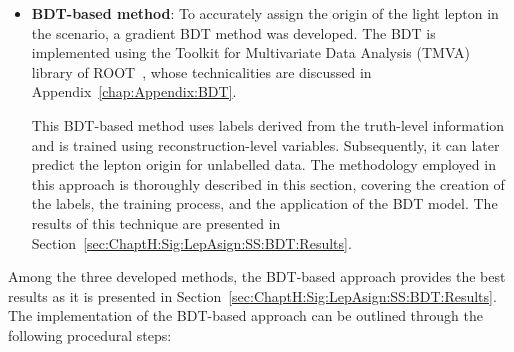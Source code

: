 \begin{itemize}
	
	\item \textbf{BDT-based method}: To accurately assign the origin of the light lepton 
	in the \dilepSStau scenario, a gradient BDT method was developed. The BDT is 
	implemented using the Toolkit for Multivariate Data Analysis (TMVA) library of 
	ROOT~\cite{Brun:1997pa, TMVAUsersGuide}, whose technicalities are discussed 
	in Appendix~\ref{chap:Appendix:BDT}.
	
	This BDT-based method uses labels derived from the truth-level information and is 
	trained using reconstruction-level variables. Subsequently, it can later predict the 
	lepton origin for unlabelled data. The methodology employed in this approach is
	thoroughly described in this section, covering the creation of the labels, the training 
	process, and the application of the BDT model. 	
	The results of this technique are presented in Section~\ref{sec:ChaptH:Sig:LepAsign:SS:BDT:Results}.


\end{itemize}

Among the three developed methods, the BDT-based approach provides the
best results as it is presented in Section~\ref{sec:ChaptH:Sig:LepAsign:SS:BDT:Results}. 
The implementation of the BDT-based approach can be outlined 
through the following procedural steps:

